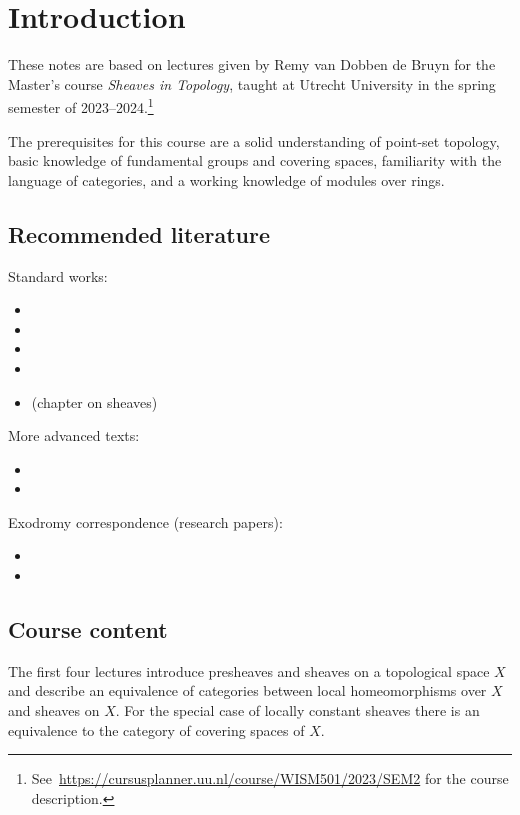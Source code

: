 \chapter*{Introduction}

These notes are based on lectures given by Remy van Dobben de Bruyn for the Master's course \emph{Sheaves in Topology}, taught at Utrecht University in the spring semester of 2023--2024.\footnote{See~\url{https://cursusplanner.uu.nl/course/WISM501/2023/SEM2} for the course description.}

The prerequisites for this course are a solid understanding of point-set topology, basic knowledge of fundamental groups and covering spaces, familiarity with the language of categories, and a working knowledge of modules over rings. 

\section*{Recommended literature}
Standard works:
\NewDocumentCommand{}
\begin{itemize}
\item {}
\item {}
\item {}
\item {}
\item {} (chapter on sheaves)
\end{itemize}
\noindent
More advanced texts:
\begin{itemize}
\item {}
\item {}
\end{itemize}
\noindent
Exodromy correspondence (research papers):
\begin{itemize}
\item {}
\item {}
\end{itemize}
\section*{Course content}
The first four lectures introduce presheaves and sheaves on a topological space $X$ and describe an equivalence of categories between local homeomorphisms over $X$ and sheaves on $X$. For the special case of locally constant sheaves there is an equivalence to the category of covering spaces of $X$. 

